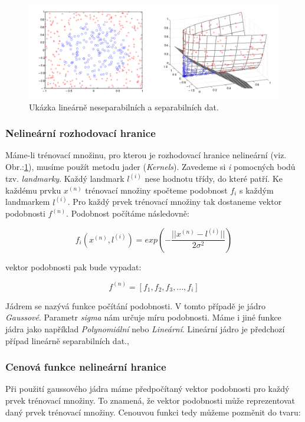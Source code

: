 \documentclass[a4]{article}
\begin{document}
\begin{figure}[!ht]
	\centering
		\includegraphics[width=\textwidth]{images/linear_nonlinear}
	\caption{Ukázka lineárně neseparabilních a separabilních dat.\cite{svm_wiki}}
	\label{fig:linear_nonlinear}
\end{figure}

\subsubsection{Nelineární rozhodovací hranice}
Máme-li trénovací množinu, pro kterou je rozhodovací hranice nelineární (viz. Obr.:\ref{fig:linear_nonlinear}), musíme použít metodu jader (\textit{Kernels}). Zavedeme si \textit{i} pomocných bodů tzv. \textit{landmarky}. Každý landmark $l^{(i)}$ nese hodnotu třídy, do které patří. Ke každému prvku $x^{(n)}$ trénovací množiny spočteme podobnost $f_{i}$ s každým landmarkem $l^{(i)}$. Pro každý prvek trénovací množiny tak dostaneme vektor podobnosti $f^{(n)}$. Podobnost počítáme následovně:

$$f_{i}(x^{(n)},l^{(i)}) = exp(-\frac{||x^{(n)} - l^{(i)}||}{2\sigma^2})$$

\noindent vektor podobnosti pak bude vypadat:

$$f^{(n)} = [f_{1},f_{2},f_{3},...,f_{i}]$$

\noindent Jádrem se nazývá funkce počítání podobnosti. V tomto případě je jádro \textit{Gaussové}. Parametr \textit{sigma} nám určuje míru podobnosti. Máme i jiné funkce jádra jako například \textit{Polynomiální} nebo \textit{Lineární}. Lineární jádro je předchozí případ lineárně separabilních dat.\cite{svm_robots},\cite{svm_wiki}

\subsubsection{Cenová funkce nelineární hranice}
Při použití gaussového jádra máme předpočítaný vektor podobnosti pro každý prvek trénovací množiny. To znamená, že vektor podobnosti může reprezentovat daný prvek trénovací množiny. Cenouvou funkci tedy můžeme pozměnit do tvaru:
\end{document}
